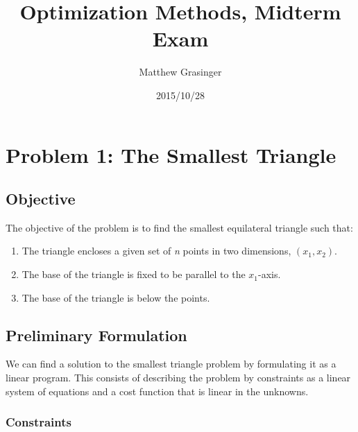 \documentclass{article}
\title{Optimization Methods, Midterm Exam}
\date{2015/10/28}
\author{Matthew Grasinger}
\begin{document}
	
	
\maketitle
\newpage
\tableofcontents
\newpage
{}

\section{Problem 1: The Smallest Triangle} \label{sec:small_triangle}

\subsection{Objective}

The objective of the problem is to find the smallest equilateral triangle such that: 
\begin{enumerate}
	\item \label{enum:enclose} The triangle encloses a given set of \textit{n} points in two dimensions, $(x_1, x_2)$.
	\item \label{enum:base_parallel} The base of the triangle is fixed to be parallel to the $x_1$-axis.
	\item \label{enum:base_below} The base of the triangle is below the points.
\end{enumerate}

\subsection{Preliminary Formulation}

We can find a solution to the smallest triangle problem by formulating it as a linear program.
This consists of describing the problem by constraints as a linear system of equations and a cost function that is linear in the unknowns.

\subsubsection{Constraints}
\end{document}
